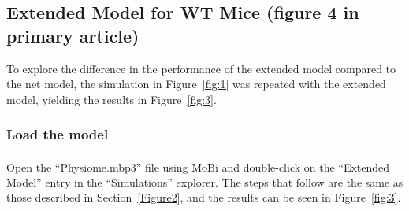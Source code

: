 \documentclass[fleqn,10pt]{physiome}
\begin{document}
\subsection{Extended Model for WT Mice (figure 4 in primary article)}\label{Figure4}

To explore the difference in the performance of the extended model compared to the net model, the simulation in Figure~\ref{fig:1} was repeated with the extended model, yielding the results in Figure~\ref{fig:3}.

\subsubsection{Load the model}
Open the ``Physiome.mbp3'' file using MoBi\textsuperscript{\textregistered} and double-click on the ``Extended Model'' entry in the ``Simulations'' explorer. The steps that follow are the same as those described in Section~\ref{Figure2}, and the results can be seen in Figure~\ref{fig:3}.
\end{document}
